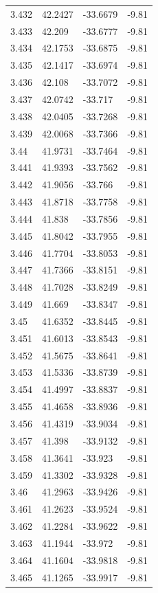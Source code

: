\begin{tabular}{llll}
3.432 & 42.2427 & -33.6679 & -9.81 \\
3.433 & 42.209 & -33.6777 & -9.81 \\
3.434 & 42.1753 & -33.6875 & -9.81 \\
3.435 & 42.1417 & -33.6974 & -9.81 \\
3.436 & 42.108 & -33.7072 & -9.81 \\
3.437 & 42.0742 & -33.717 & -9.81 \\
3.438 & 42.0405 & -33.7268 & -9.81 \\
3.439 & 42.0068 & -33.7366 & -9.81 \\
3.44 & 41.9731 & -33.7464 & -9.81 \\
3.441 & 41.9393 & -33.7562 & -9.81 \\
3.442 & 41.9056 & -33.766 & -9.81 \\
3.443 & 41.8718 & -33.7758 & -9.81 \\
3.444 & 41.838 & -33.7856 & -9.81 \\
3.445 & 41.8042 & -33.7955 & -9.81 \\
3.446 & 41.7704 & -33.8053 & -9.81 \\
3.447 & 41.7366 & -33.8151 & -9.81 \\
3.448 & 41.7028 & -33.8249 & -9.81 \\
3.449 & 41.669 & -33.8347 & -9.81 \\
3.45 & 41.6352 & -33.8445 & -9.81 \\
3.451 & 41.6013 & -33.8543 & -9.81 \\
3.452 & 41.5675 & -33.8641 & -9.81 \\
3.453 & 41.5336 & -33.8739 & -9.81 \\
3.454 & 41.4997 & -33.8837 & -9.81 \\
3.455 & 41.4658 & -33.8936 & -9.81 \\
3.456 & 41.4319 & -33.9034 & -9.81 \\
3.457 & 41.398 & -33.9132 & -9.81 \\
3.458 & 41.3641 & -33.923 & -9.81 \\
3.459 & 41.3302 & -33.9328 & -9.81 \\
3.46 & 41.2963 & -33.9426 & -9.81 \\
3.461 & 41.2623 & -33.9524 & -9.81 \\
3.462 & 41.2284 & -33.9622 & -9.81 \\
3.463 & 41.1944 & -33.972 & -9.81 \\
3.464 & 41.1604 & -33.9818 & -9.81 \\
3.465 & 41.1265 & -33.9917 & -9.81 \\

\end{tabular}

